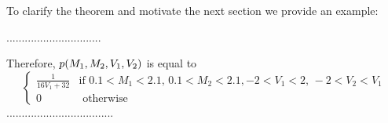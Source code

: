 \documentclass[letterpaper]{article}
\newcommand{\otherwise}[1]{#1 &\text{ otherwise}}
\newcommand{\pr}{p}
\newcommand{\dd}{\;\mathrm{d}} %
\begin{document}

To clarify the theorem and motivate the next section we provide an example:

...............................

Therefore,
$\footnotesize{\pr(M_1, M_2, V_1, V_2)}$ is equal to 
$$
\begin{cases}
\frac{1}{16 V_1 + 32} &{\text{if }\scriptstyle 0.1<M_1<2.1, \, 0.1<M_2<2.1,}
							 {\scriptstyle -2<V_1<2, \, -2<V_2 < V_1}\\
 \otherwise{0}
 \end{cases}
$$  
...................................
\end{document}
